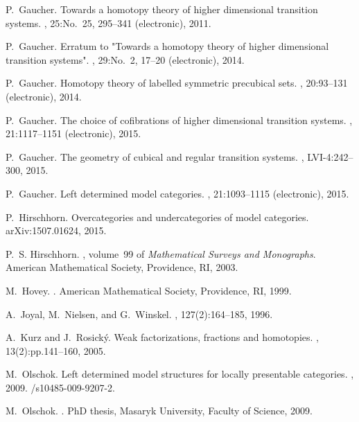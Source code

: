 \documentclass[a4paper,12pt]{amsart}
\begin{document}
\begin{thebibliography}{10}
P.~Gaucher.
\newblock Towards a homotopy theory of higher dimensional transition systems.
, 25:No.\ 25, 295--341 (electronic), 2011.

P.~Gaucher.
\newblock Erratum to "{T}owards a homotopy theory of higher dimensional
  transition systems".
, 29:No.\ 2, 17--20 (electronic), 2014.

P.~Gaucher.
\newblock Homotopy theory of labelled symmetric precubical sets.
, 20:93--131 (electronic), 2014.

P.~Gaucher.
\newblock The choice of cofibrations of higher dimensional transition systems.
, 21:1117--1151 (electronic), 2015.

P.~Gaucher.
\newblock The geometry of cubical and regular transition systems.
, LVI-4:242--300, 2015.

P.~Gaucher.
\newblock Left determined model categories.
, 21:1093--1115 (electronic), 2015.

P.~Hirschhorn.
\newblock Overcategories and undercategories of model categories.
\newblock arXiv:1507.01624, 2015.

P.~S. Hirschhorn.
, volume~99 of {\em
  Mathematical Surveys and Monographs}.
\newblock American Mathematical Society, Providence, RI, 2003.

M.~Hovey.
.
\newblock American Mathematical Society, Providence, RI, 1999.

A.~Joyal, M.~Nielsen, and G.~Winskel.
, 127(2):164--185, 1996.

A.~Kurz and J.~Rosick{\'y}.
\newblock Weak factorizations, fractions and homotopies.
, 13(2):pp.141--160, 2005.

M.~Olschok.
\newblock Left determined model structures for locally presentable categories.
, 2009.
/s10485-009-9207-2.

M.~Olschok.
.
\newblock PhD thesis, Masaryk University, Faculty of Science, 2009.


\end{thebibliography}
\end{document}
